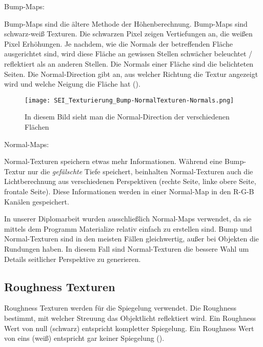 {Bump-Maps:

Bump-Maps sind die ältere Methode der Höhenberechnung. Bump-Maps sind schwarz-weiß Texturen. Die schwarzen Pixel
zeigen Vertiefungen an, die weißen Pixel Erhöhungen. Je nachdem, wie die Normals der betreffenden Fläche ausgerichtet
sind, wird diese Fläche an gewissen Stellen schwächer beleuchtet / reflektiert als an anderen Stellen. Die Normals
einer Fläche sind die belichteten Seiten. Die Normal-Direction gibt an, aus welcher Richtung die Textur angezeigt
wird und welche Neigung die Fläche hat ().

\begin{figure}[H]
    \centering
    \texttt{[image: SEI\_Texturierung\_Bump-NormalTexturen-Normals.png]}
    \caption{In diesem Bild sieht man die Normal-Direction der verschiedenen Flächen}
    \label{picture:normals}
\end{figure}


Normal-Maps:

Normal-Texturen speichern etwas mehr Informationen. Während eine Bump-Textur nur die \textit{gefälschte} Tiefe
speichert, beinhalten Normal-Texturen auch die Lichtberechnung aus verschiedenen Perspektiven (rechte Seite,
linke obere Seite, frontale Seite). Diese Informationen werden in einer Normal-Map in den R-G-B Kanälen gespeichert.

In unserer Diplomarbeit wurden ausschließlich Normal-Maps verwendet, da sie mittels dem Programm
Materialize\citep{bbs:materialize} relativ einfach zu erstellen sind. Bump und Normal-Texturen sind in den meisten
Fällen gleichwertig, außer bei Objekten die Rundungen haben. In diesem Fall sind Normal-Texturen die bessere Wahl
um Details seitlicher Perspektive zu generieren.

\subsection{Roughness Texturen}
\label{sec:tex_roughness}

Roughness Texturen werden für die Spiegelung verwendet. Die Roughness bestimmt, mit welcher Streuung das Objektlicht
reflektiert wird. Ein Roughness Wert von null (schwarz) entspricht kompletter Spiegelung. Ein Roughness Wert von eins
(weiß) entspricht gar keiner Spiegelung ().

}
